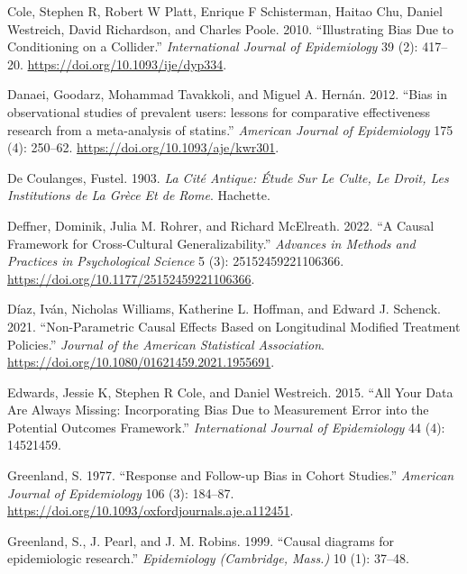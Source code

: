 \documentclass[
  singlecolumn]{report}
\newlength{\cslhangindent}
\newlength{\cslentryspacingunit} %
\newenvironment{CSLReferences}[2] %
 {%
  \setlength{\parindent}{0pt}
  \ifodd #1
  \let\oldpar\par
  \def\par{\hangindent=\cslhangindent\oldpar}
  \fi
  \setlength{\parskip}{#2\cslentryspacingunit}
 }%
 {}
\begin{document}
\begin{CSLReferences}{1}{0}
\leavevmode{}%
Cole, Stephen R, Robert W Platt, Enrique F Schisterman, Haitao Chu,
Daniel Westreich, David Richardson, and Charles Poole. 2010.
{``Illustrating Bias Due to Conditioning on a Collider.''}
\emph{International Journal of Epidemiology} 39 (2): 417--20.
\url{https://doi.org/10.1093/ije/dyp334}.

\leavevmode{}%
Danaei, Goodarz, Mohammad Tavakkoli, and Miguel A. Hernán. 2012. {``Bias
in observational studies of prevalent users: lessons for comparative
effectiveness research from a meta-analysis of statins.''}
\emph{American Journal of Epidemiology} 175 (4): 250--62.
\url{https://doi.org/10.1093/aje/kwr301}.

\leavevmode{}%
De Coulanges, Fustel. 1903. \emph{La Cité Antique: Étude Sur Le Culte,
Le Droit, Les Institutions de La Grèce Et de Rome}. Hachette.

\leavevmode{}%
Deffner, Dominik, Julia M. Rohrer, and Richard McElreath. 2022. {``A
Causal Framework for Cross-Cultural Generalizability.''} \emph{Advances
in Methods and Practices in Psychological Science} 5 (3):
25152459221106366. \url{https://doi.org/10.1177/25152459221106366}.

\leavevmode{}%
Díaz, Iván, Nicholas Williams, Katherine L. Hoffman, and Edward J.
Schenck. 2021. {``Non-Parametric Causal Effects Based on Longitudinal
Modified Treatment Policies.''} \emph{Journal of the American
Statistical Association}.
\url{https://doi.org/10.1080/01621459.2021.1955691}.

\leavevmode{}%
Edwards, Jessie K, Stephen R Cole, and Daniel Westreich. 2015. {``All
Your Data Are Always Missing: Incorporating Bias Due to Measurement
Error into the Potential Outcomes Framework.''} \emph{International
Journal of Epidemiology} 44 (4): 14521459.

\leavevmode{}%
Greenland, S. 1977. {``Response and Follow-up Bias in Cohort Studies.''}
\emph{American Journal of Epidemiology} 106 (3): 184--87.
\url{https://doi.org/10.1093/oxfordjournals.aje.a112451}.

\leavevmode{}%
Greenland, S., J. Pearl, and J. M. Robins. 1999. {``Causal diagrams for
epidemiologic research.''} \emph{Epidemiology (Cambridge, Mass.)} 10
(1): 37--48.


\end{CSLReferences}
\end{document}
